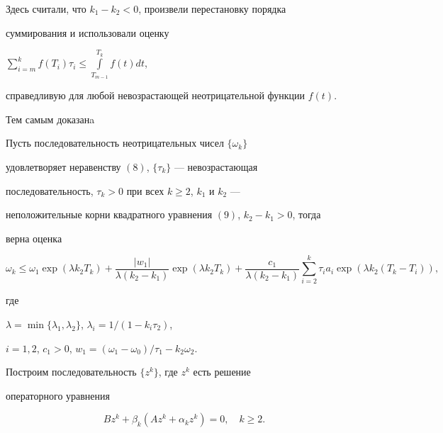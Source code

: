 Здесь считали, что $k_1-k_2 <0$, произвели перестановку порядка


суммирования и использовали оценку


$\sum\limits_{i=m}^kf(T_i)\tau_i\leq


\int\limits_{T_{m-1}}^{T_k}f(t)dt$,


справедливую для любой невозрастающей неотрицательной функции $f(t)$.


Тем самым доказанa





\begin{lem}


Пусть последовательность неотрицательных чисел $\{\omega_k\}$


удовлетворяет неравенству $(8)$, $\{\tau_k\}$ --- невозрастающая


последовательность, $\tau_k >0$ при всех $k\geq 2$, $k_1$ и $k_2$ ---


неположительные корни квадратного уравнения $(9)$, $k_2-k_1>0$, тогда


верна оценка


\begin{equation}\label {15}


\omega_k\leq \omega_1\exp(\lambda k_2T_k)+\frac{|w_1|}{\lambda


(k_2-k_1)}\exp(


\lambda k_2T_k)+\frac{c_1}{\lambda (k_2-k_1)}\sum_{i=2}^k


\tau_ia_i\exp(\lambda k_2(T_k-T_i)),


\end{equation}


где


$\lambda =\min\{\lambda_1,\lambda_2\}$, $\lambda_i=1/(1-k_i\tau_2)$,


$i=1,2$, $c_1>0$, $w_1=(\omega_1-\omega_0)/\tau_1-k_2\omega_2$.


\end{lem}





Построим последовательность $\{z^k\}$, где $z^k$ есть решение


операторного уравнения


\begin{equation}\label {16}


Bz^k+\beta_k(Az^k+\alpha_kz^k)=0,\quad k\geq 2.


\end{equation}


